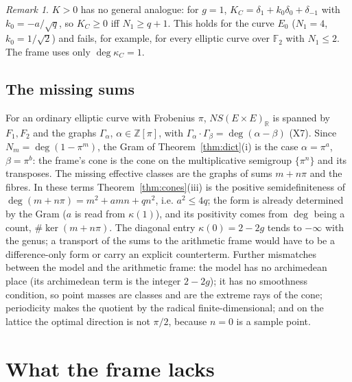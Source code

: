 \documentclass[11pt]{amsart}
\theoremstyle{definition}
\theoremstyle{remark}
\newtheorem{remark}[theorem]{Remark}
\newcommand{\R}{\mathbb R}
\newcommand{\Z}{\mathbb Z}
\newcommand{\F}{\mathbb F}
\newcommand{\dg}{\deg}
\newcommand{\Kc}{\kappa_C}
\begin{document}
\begin{remark}
$K>0$ has no general analogue: for $g=1$, $K_C=\delta_1+k_0\delta_0+\delta_{-1}$ with $k_0=-a/\sqrt q$, so
$K_C\ge0$ iff $N_1\ge q+1$. This holds for the curve $E_0$ ($N_1=4$, $k_0=1/\sqrt2$) and fails, for
example, for every elliptic curve over $\F_2$ with $N_1\le2$. The frame uses only $\dg\Kc=1$.
\end{remark}

\subsection{The missing sums}
For an ordinary elliptic curve with Frobenius $\pi$, $NS(E\times E)_\R$ is spanned by $F_1,F_2$ and the graphs
$\Gamma_\alpha$, $\alpha\in\Z[\pi]$, with $\Gamma_\alpha\cdot\Gamma_\beta=\deg(\alpha-\beta)$ (X7). Since $N_m=\deg(1-\pi^m)$,
the Gram of Theorem~\ref{thm:dict}(i) is the case $\alpha=\pi^a$, $\beta=\pi^b$: the frame's cone is the cone on the
multiplicative semigroup $\{\pi^n\}$ and its transposes. The missing effective classes are the graphs of sums
$m+n\pi$ and the fibres. In these terms Theorem~\ref{thm:cones}(iii) is the positive semidefiniteness of
$\deg(m+n\pi)=m^2+amn+qn^2$, i.e. $a^2\le4q$; the form is already determined by the Gram ($a$ is read from
$\kappa(1)$), and its positivity comes from $\deg$ being a count, $\#\ker(m+n\pi)$. The diagonal entry
$\kappa(0)=2-2g$ tends to $-\infty$ with the genus; a transport of the sums to the arithmetic frame would have
to be a difference-only form or carry an explicit counterterm. Further mismatches between the model and the
arithmetic frame: the model has no archimedean place (its archimedean term is the integer $2-2g$); it has no
smoothness condition, so point masses are classes and are the extreme rays of the cone; periodicity makes
the quotient by the radical finite-dimensional; and on the lattice the optimal direction is not $\pi/2$,
because $n=0$ is a sample point.

\section{What the frame lacks}\label{sec:open}
\end{document}
